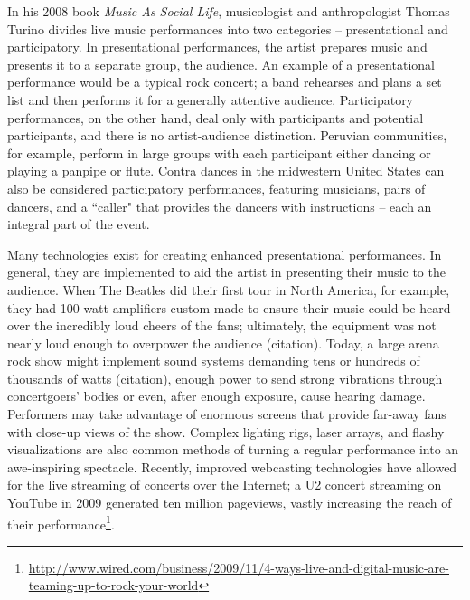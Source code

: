 In his 2008 book \textit{Music As Social Life}, musicologist and anthropologist Thomas Turino divides live music performances into two categories -- presentational and participatory. In presentational performances, the artist prepares music and presents it to a separate group, the audience. An example of a presentational performance would be a typical rock concert; a band rehearses and plans a set list and then performs it for a generally attentive audience. Participatory performances, on the other hand, deal only with participants and potential participants, and there is no artist-audience distinction. Peruvian communities, for example, perform in large groups with each participant either dancing or playing a panpipe or flute. Contra dances in the midwestern United States can also be considered participatory performances, featuring musicians, pairs of dancers, and a ``caller" that provides the dancers with instructions -- each an integral part of the event.

Many technologies exist for creating enhanced presentational performances. In general, they are implemented to aid the artist in presenting their music to the audience. When The Beatles did their first tour in North America, for example, they had 100-watt amplifiers custom made to ensure their music could be heard over the incredibly loud cheers of the fans; ultimately, the equipment was not nearly loud enough to overpower the audience (citation). Today, a large arena rock show might implement sound systems demanding tens or hundreds of thousands of watts (citation), enough power to send strong vibrations through concertgoers' bodies or even, after enough exposure, cause hearing damage. Performers may take advantage of enormous screens that provide far-away fans with close-up views of the show. Complex lighting rigs, laser arrays, and flashy visualizations are also common methods of turning a regular performance into an awe-inspiring spectacle. Recently, improved webcasting technologies have allowed for the live streaming of concerts over the Internet; a U2 concert streaming on YouTube in 2009 generated ten million pageviews, vastly increasing the reach of their performance\footnote{\url{http://www.wired.com/business/2009/11/4-ways-live-and-digital-music-are-teaming-up-to-rock-your-world}}.


